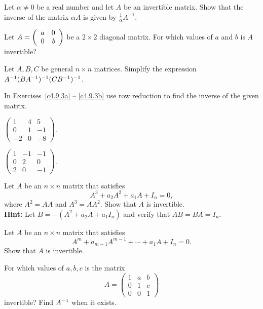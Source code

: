 \begin{exercise} \label{c4.8.2}
Let $\alpha \not=0$ be a real number and let $A$ be an invertible
matrix.  Show that the inverse of the matrix $\alpha A$ is given by
$\frac{1}{\alpha}A^{-1}$.
\end{exercise}

\begin{exercise} \label{c4.8.3}
Let $A=\left(\begin{array}{rr} a & 0\\ 0 &b\end{array}\right)$ be a $2\times 2$ diagonal matrix.
For which values of $a$ and $b$ is $A$ invertible?
\end{exercise}

\begin{exercise} \label{c4.8.4}
Let $A,B,C$ be general $n\times n$ matrices.  Simplify the expression
$A^{-1}(BA^{-1})^{-1}(CB^{-1})^{-1}$.
\end{exercise}

\noindent In Exercises~\ref{c4.9.3a} -- \ref{c4.9.3b} use row reduction
to find the inverse of the given matrix.
\begin{exercise} \label{c4.9.3a}
$\left(\begin{array}{rrr} 1 & 4 & 5\\ 0 & 1 & -1\\ -2 & 0 & -8
\end{array}\right)$.
\end{exercise}
\begin{exercise} \label{c4.9.3b}
$\left(\begin{array}{rrr} 1 & -1 & -1\\ 0 & 2 & 0\\ 2 & 0 & -1
\end{array}\right)$.
\end{exercise}

\begin{exercise} \label{c4.8.5}
Let $A$ be an $n\times n$ matrix that satisfies
\[
A^3 + a_2A^2 + a_1A + I_n = 0,
\]
where $A^2=AA$ and $A^3=AA^2$.  Show that $A$ is invertible. \\
{\bf Hint:}  Let $B = -(A^2+a_2A+a_1I_n)$ and verify that $AB=BA=I_n$.
\end{exercise}

\begin{exercise} \label{c4.8.6}
Let $A$ be an $n\times n$ matrix that satisfies
\[
A^m + a_{m-1}A^{m-1} + \cdots + a_1A + I_n = 0.
\]
Show that $A$ is invertible.
\end{exercise}

\begin{exercise} \label{c4.9.6}
For which values of $a,b,c$ is the matrix
\[
A =\left(\begin{array}{rrr} 1 & a & b\\ 0 & 1 & c\\ 0 & 0 & 1
\end{array}\right)
\]
invertible?  Find $A^{-1}$ when it exists.
\end{exercise}


